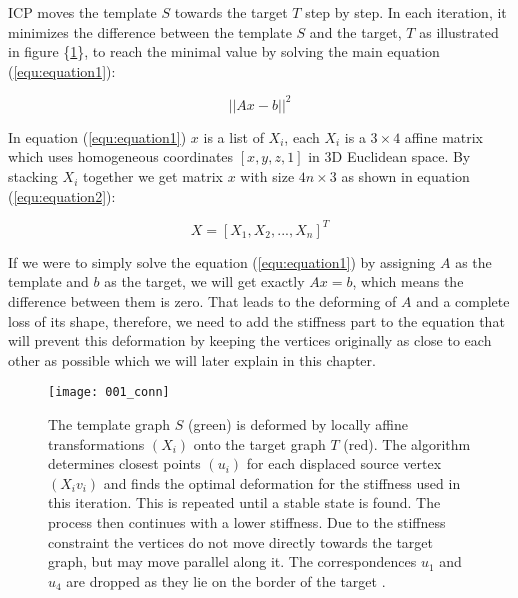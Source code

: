 \documentclass[../structure.tex]{subfiles}
\begin{document}
\hspace{2em}ICP moves the template $S$ towards the target $T$ step by step. In each iteration, it minimizes the difference between the template $S$ and the target, $T$ as illustrated in figure \{\ref{fig:figure1}\}, to reach the minimal value by solving the main equation (\ref{equ:equation1}):

\begin{equation}
\label{equ:equation1}
||Ax-b||^2
\end{equation}

\hspace{2em}In equation (\ref{equ:equation1}) $x$ is a list of $X_i$, each $X_i$ is a $3\times4$ affine matrix which uses homogeneous coordinates $[x,y,z,1]$ in 3D Euclidean space. By stacking $X_i$ together we get matrix $x$ with size $4n\times3$  as shown in equation (\ref{equ:equation2}):

\begin{equation}
\label{equ:equation2}
X = [X_1, X_2, ... ,X_n]^T
\end{equation}

If we were to simply solve the equation (\ref{equ:equation1}) by assigning $A$ as the template and $b$ as the target, we will get exactly $Ax=b$, which means the difference between them is zero. That leads to the deforming of $A$ and a complete loss of its shape, therefore, we need to add the stiffness part to the equation that will prevent this deformation by keeping the vertices originally as close to each other as possible which we will later explain in this chapter.

\begin{figure}[h!]
\centering
\texttt{[image: 001\_conn]}
\captionsetup{justification=centering}
\caption{The template graph $S$ (green) is deformed by locally affine transformations $(X_{i})$ onto the target graph $T$ (red). The algorithm determines closest points $(u_{i})$ for each displaced source vertex $(X_{i}v_{i})$ and finds the optimal deformation for the stiffness used in this iteration. This is repeated until a stable state is found. The process then continues with a lower stiffness. Due to the stiffness constraint the vertices do not move directly towards the target graph, but may move parallel along it. The correspondences $u_{1}$
and $u_{4}$ are dropped as they lie on the border of the target \cite{Amberg2007}.}
\label{fig:figure1}
\end{figure}
\end{document}
